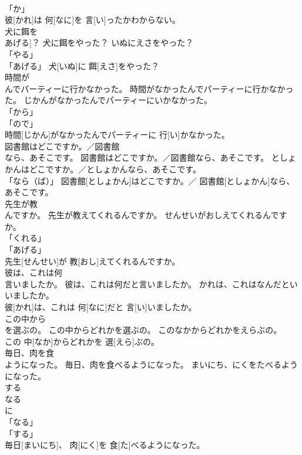 \documentclass[8pt]{extreport}
\begin{document}
\begin{CJK}{UTF8}{min}
\\	「か」 
\\	彼[かれ]は 何[なに]を 言[い]ったかわからない。		
\\	犬に餌を
\\	あげる]？	犬に餌をやった？	いぬにえさをやった？	
\\	「やる」 
\\	「あげる」	犬[いぬ]に 餌[えさ]をやった？		
\\	時間が
\\	んでパーティーに行かなかった。	時間がなかったんでパーティーに行かなかった。	じかんがなかったんでパーティーにいかなかった。	
\\	「から」 
\\	「ので」 
\\	時間[じかん]がなかったんでパーティーに 行[い]かなかった。		
\\	図書館はどこですか。／図書館
\\	なら、あそこです。	図書館はどこですか。／図書館なら、あそこです。	としょかんはどこですか。／としょかんなら、あそこです。	
\\	「なら（ば）」	図書館[としょかん]はどこですか。／ 図書館[としょかん]なら、あそこです。		
\\	先生が教
\\	んですか。	先生が教えてくれるんですか。	せんせいがおしえてくれるんですか。	
\\	「くれる」 
\\	「あげる」 
\\	先生[せんせい]が 教[おし]えてくれるんですか。		
\\	彼は、これは何
\\	言いましたか。	彼は、これは何だと言いましたか。	かれは、これはなんだといいましたか。	
\\	彼[かれ]は、これは 何[なに]だと 言[い]いましたか。		
\\	この中から
\\	を選ぶの。	この中からどれかを選ぶの。	このなかからどれかをえらぶの。	
\\	この 中[なか]からどれかを 選[えら]ぶの。		
\\	毎日、肉を食
\\	ようになった。	毎日、肉を食べるようになった。	まいにち、にくをたべるようになった。	
\\	する 
\\	なる 
\\	に 
\\	「なる」 
\\	「する」 
\\	毎日[まいにち]、 肉[にく]を 食[た]べるようになった。		

\end{CJK}
\end{document}
